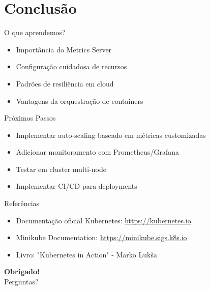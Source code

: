 \documentclass{beamer}
\begin{document}
\section{Conclusão}

\begin{frame}{O que aprendemos?}
    \begin{itemize}
        \item Importância do Metrics Server
        \item Configuração cuidadosa de recursos
        \item Padrões de resiliência em cloud
        \item Vantagens da orquestração de containers
    \end{itemize}
\end{frame}

\begin{frame}{Próximos Passos}
    \begin{itemize}
        \item Implementar auto-scaling baseado em métricas customizadas
        \item Adicionar monitoramento com Prometheus/Grafana
        \item Testar em cluster multi-node
        \item Implementar CI/CD para deployments
    \end{itemize}
\end{frame}

\begin{frame}{Referências}
    \begin{itemize}
        \item Documentação oficial Kubernetes: \url{https://kubernetes.io}
        \item Minikube Documentation: \url{https://minikube.sigs.k8s.io}
        \item Livro: "Kubernetes in Action" - Marko Lukša
    \end{itemize}
    \centering
    \vspace{1cm}
    \textbf{Obrigado!}\\
    \small Perguntas?
\end{frame}
\end{document}
